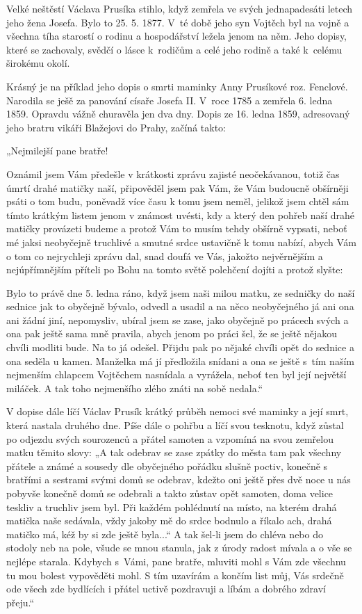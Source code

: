 \documentclass[../dejiny-rodu-prusiku.tex]{subfiles}
\begin{document}
Velké neštěstí Václava Prusíka stihlo, když zemřela ve svých jednapadesáti letech jeho žena Josefa. Bylo to 25. 5. 1877. V té době jeho syn Vojtěch byl na vojně a všechna tíha starostí o rodinu a hospodářství ležela jenom na něm. Jeho dopisy, které se zachovaly, svědčí o lásce k rodičům a celé jeho rodině a také k celému širokému okolí.

Krásný je na příklad jeho dopis o smrti maminky Anny Prusíkové roz. Fenclové. Narodila se ješě za panování císaře Josefa  II. V roce 1785 a zemřela 6. ledna 1859. Opravdu vážně churavěla jen dva dny. Dopis ze 16. ledna 1859, adresovaný jeho bratru vikáři Blažejovi do Prahy, začíná
takto:

„Nejmilejší pane bratře!

Oznámil jsem Vám předešle v krátkosti zprávu zajisté neočekávanou, totiž čas úmrtí drahé matičky naší, připověděl jsem pak Vám, že Vám budoucně obšírněji psáti o tom budu, poněvadž více času k tomu jsem neměl, jelikož jsem chtěl sám tímto krátkým listem jenom v známost uvésti, kdy a který den pohřeb naší drahé matičky provázeti budeme a protož  Vám to musím tehdy obšírně vypsati, neboť mé jaksi neobyčejně truchlivé a smutné srdce ustavičně k tomu nabízí, abych Vám o tom co nejrychleji zprávu dal, snad doufá ve Vás, jakožto nejvěrnějším a nejúpřímnějším příteli po Bohu na tomto světě polehčení dojíti a protož slyšte:

Bylo to právě dne 5. ledna ráno, když jsem naši milou matku, ze sedničky do naší sednice jak to obyčejně bývalo, odvedl a usadil a na něco neobyčejného já ani ona ani žádní jiní, nepomysliv, ubíral jsem se zase, jako obyčejně po prácech svých a ona pak ještě sama mně pravila, abych jenom po práci šel, že se ještě nějakou chvíli modliti bude. Na to já odešel. Přijdu pak po nějaké chvíli opět do sednice a ona seděla u kamen. Manželka má jí předložila snídani a ona se ještě s tím naším nejmenším chlapcem Vojtěchem nasnídala a vyrážela, neboť ten byl její největší miláček. A tak toho nejmenšího zlého znáti na sobě nedala.“

V dopise dále líčí Václav Prusík krátký průběh nemoci své maminky a její smrt, která nastala druhého dne. Píše dále o pohřbu a líčí svou tesknotu, když zůstal po odjezdu svých sourozenců a přátel samoten a vzpomíná na svou zemřelou matku těmito slovy: „A tak odebrav se zase zpátky do města tam pak všechny přátele a známé a sousedy dle obyčejného pořádku slušně poctiv, konečně s bratřími a sestrami svými domů se odebrav, kdežto oni ještě přes dvě noce u nás pobyvše konečně domů se odebrali a takto zůstav opět samoten, doma velice teskliv a truchliv jsem byl. Při každém pohlédnutí na místo, na kterém drahá matička naše sedá­vala, vždy jakoby mě do srdce bodnulo a říkalo ach, drahá matičko má, kéž by si zde ještě byla...“ A tak šel-li jsem do chléva nebo do stodoly neb na pole, všude se mnou stanula, jak z úrody radost mívala a o vše se nejlépe starala. Kdybych s Vámi, pane bratře, mluviti mohl s Vám zde všechnu tu mou bolest vypověděti mohl. S tím uzavírám a končím list můj, Vás srdečně ode  všech zde bydlících i přátel uctivě pozdravuji a líbám a dobrého zdraví přeju.“
\end{document}
